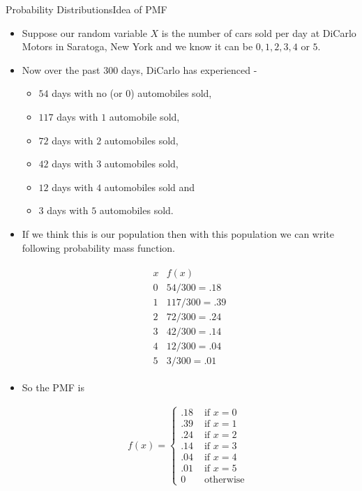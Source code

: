 \documentclass[8pt, usepdftitle=false]{beamer}
\begin{document}
\begin{frame}[allowframebreaks]{Probability Distributions}{Idea of PMF}
\begin{itemize}
\item Suppose our random variable $X$ is the number of cars sold per day at DiCarlo Motors in Saratoga, New York and we know it can be $0, 1, 2, 3, 4$ or $5$.


\item Now over the past $300$ days, DiCarlo has experienced - 

\begin{itemize}
	\item $54$ days with no (or $0$) automobiles sold, 
	\item $117 $ days with $1$ automobile sold, 
	\item $72$ days with $2$ automobiles sold, 
	\item $42$ days with $3 $ automobiles sold, 
	\item $12$ days with $4$ automobiles sold and 
	\item $3$ days with $5$ automobiles sold.
\end{itemize}


\item If we think this is our population then with this population we can write following probability mass function.


\begin{table}
\centering
\begin{align*}
\begin{array}{c|c}
x & f(x)  \\ \hline
0 & 54/300 = .18 \\
1 & 117/300 = .39 \\
2 & 72/300 = .24 \\
3 & 42/300 = .14 \\
4 & 12/300 = .04 \\
5 & 3/300 = .01
\end{array}
\end{align*}

\end{table}

\item So the PMF is 

\begin{align*}
f(x)= \begin{cases} .18 & \text { if } x=0 \\ 
.39 & \text { if } x=1 \\ 
.24 & \text { if } x=2 \\ 
.14 & \text { if } x=3 \\
.04 & \text { if } x=4 \\
.01 & \text { if } x=5 \\
0 & \text { otherwise }\end{cases}
\end{align*}





\end{itemize}
\end{frame}
\end{document}
